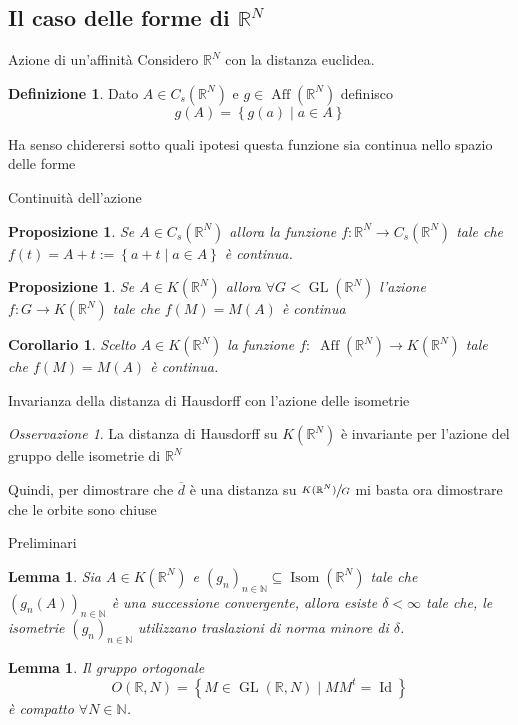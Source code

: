 \documentclass{beamer}
\newcounter{counter1}
\theoremstyle{plain}
\newtheorem{mylem}[counter1]{Lemma}
\newtheorem{mypro}[counter1]{Proposizione}
\newtheorem{mycor}[counter1]{Corollario}
\theoremstyle{definition}
\newtheorem{mydef}[counter1]{Definizione}
\theoremstyle{remark}
\newtheorem{myoss}[counter1]{Osservazione}
\newcommand{\obar}[1]{\overline{#1}}
\newcommand{\set}[1]{\left\{#1\right\}}
\newcommand{\pa}[1]{\left(#1\right)}
\DeclareMathOperator{\id}{Id}
\DeclareMathOperator{\gl}{GL}
\DeclareMathOperator{\aff}{Aff}
\DeclareMathOperator{\isom}{Isom}
\begin{document}
\subsection{Il caso delle forme di $\mathbb{R}^N$}

\begin{frame}{Azione di un'affinità}
  Considero $\mathbb{R}^N$ con la distanza euclidea.
  \begin{mydef}
    Dato $A \in C_s(\mathbb{R}^N)$ e $g \in \aff (\mathbb{R}^N)$
    definisco
    \[ g(A) = \set{ g(a) \mid a \in A } \]
  \end{mydef}
  Ha senso chiderersi sotto quali ipotesi questa funzione sia continua
  nello spazio delle forme
\end{frame}

\begin{frame}{Continuità dell'azione}
  \begin{mypro}
    Se $A \in C_s(\mathbb{R}^N)$ allora la funzione $f: \mathbb{R}^N \to
    C_s(\mathbb{R}^N)$ tale che $f(t) = A + t := \set { a + t \mid a \in
      A}$ è continua.
  \end{mypro}
  \begin{mypro}
    Se $A \in K(\mathbb{R}^N)$ allora $\forall G < \gl (\mathbb{R}^N)$
    l'azione $f: G \rightarrow K(\mathbb{R}^N)$ tale che $f(M) = M(A)$
    è continua
  \end{mypro}
  \begin{mycor}
    Scelto $A \in K(\mathbb{R}^N)$ la funzione $f:\; \aff( \mathbb{R}^N)
    \to K(\mathbb{R}^N)$ tale che $f(M) = M(A)$ è continua.
  \end{mycor}
\end{frame}

\begin{frame}{Invarianza della distanza di Hausdorff con l'azione
    delle isometrie}
  \begin{myoss}
    La distanza di Hausdorff su $K(\mathbb{R}^N)$ è invariante per
    l'azione del gruppo delle isometrie di $\mathbb{R}^N$
  \end{myoss}

  Quindi, per dimostrare che $\obar d$ è una distanza su
  $\sfrac{K(\mathbb{R}^N)}{G}$ mi basta ora dimostrare che le orbite
  sono chiuse
\end{frame}

\begin{frame}{Preliminari}
  \begin{mylem}
    Sia $A \in K(\mathbb{R}^N)$ e $\pa{ g_n} _{n \in \mathbb{N}}
    \subseteq \isom( \mathbb{R}^N)$ tale che $\pa{ g_n(A) } _{n \in
      \mathbb{N}}$ è una successione convergente, allora esiste $\delta
    < \infty$ tale che, le isometrie $\pa{ g_n} _{n\in \mathbb{N}}$
    utilizzano traslazioni di norma minore di $\delta$.
  \end{mylem}
  \begin{mylem}
    Il gruppo ortogonale 
    \[ O(\mathbb{R},N) = \set{ M \in \gl (\mathbb{R},N) \mid M M^t =
      \id } \]
    è compatto $\forall N \in \mathbb{N}$.
  \end{mylem}
\end{frame}
\end{document}
